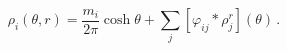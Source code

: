 \begin{equation}
\rho _{i}(\theta ,r)=\frac{m_{i}}{2\pi }\cosh \theta
+\sum\limits_{j}[\varphi _{ij}\ast \rho _{j}^{r}](\theta )\,.  \label{rho}
\end{equation}

